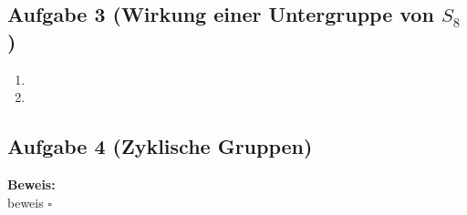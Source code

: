 \documentclass[11pt,a4paper,ngerman]{article}
\begin{document}
\subsection*{Aufgabe 3 \mdseries (Wirkung einer Untergruppe von $S_8$)}

\begin{enumerate}[\bfseries a)]
\item 
\item 
\end{enumerate}

\subsection*{Aufgabe 4 \mdseries (Zyklische Gruppen)}

\textbf{Beweis:}\\
beweis
\mbox{} \hfill $\square$\\

\label{LastPage}
\end{document}
